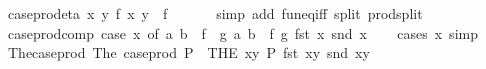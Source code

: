 \begin{isabellebody}
\isanewline
%
\endisadelimproof
\isanewline
{}\isamarkupfalse%
\ case{\isacharunderscore}{\kern0pt}prod{\isacharunderscore}{\kern0pt}eta{\isacharcolon}{\kern0pt}\ {\isachardoublequoteopen}{\isacharparenleft}{\kern0pt}{\isasymlambda}{\isacharparenleft}{\kern0pt}x{\isacharcomma}{\kern0pt}\ y{\isacharparenright}{\kern0pt}{\isachardot}{\kern0pt}\ f\ {\isacharparenleft}{\kern0pt}x{\isacharcomma}{\kern0pt}\ y{\isacharparenright}{\kern0pt}{\isacharparenright}{\kern0pt}\ {\isacharequal}{\kern0pt}\ f{\isachardoublequoteclose}\isanewline
\ \ %
\isanewline
%
\isadelimproof
\ \ %
\endisadelimproof
%
\isatagproof
{}\isamarkupfalse%
\ {\isacharparenleft}{\kern0pt}simp\ add{\isacharcolon}{\kern0pt}\ fun{\isacharunderscore}{\kern0pt}eq{\isacharunderscore}{\kern0pt}iff\ split{\isacharcolon}{\kern0pt}\ prod{\isachardot}{\kern0pt}split{\isacharparenright}{\kern0pt}%
\endisatagproof
{\isafoldproof}%
%
\isadelimproof
\isanewline
%
\endisadelimproof
\isanewline
\isanewline
\isanewline
{}\isamarkupfalse%
\ case{\isacharunderscore}{\kern0pt}prod{\isacharunderscore}{\kern0pt}comp{\isacharcolon}{\kern0pt}\ {\isachardoublequoteopen}{\isacharparenleft}{\kern0pt}case\ x\ of\ {\isacharparenleft}{\kern0pt}a{\isacharcomma}{\kern0pt}\ b{\isacharparenright}{\kern0pt}\ {\isasymRightarrow}\ {\isacharparenleft}{\kern0pt}f\ {\isasymcirc}\ g{\isacharparenright}{\kern0pt}\ a\ b{\isacharparenright}{\kern0pt}\ {\isacharequal}{\kern0pt}\ f\ {\isacharparenleft}{\kern0pt}g\ {\isacharparenleft}{\kern0pt}fst\ x{\isacharparenright}{\kern0pt}{\isacharparenright}{\kern0pt}\ {\isacharparenleft}{\kern0pt}snd\ x{\isacharparenright}{\kern0pt}{\isachardoublequoteclose}\isanewline
%
\isadelimproof
\ \ %
\endisadelimproof
%
\isatagproof
{}\isamarkupfalse%
\ {\isacharparenleft}{\kern0pt}cases\ x{\isacharparenright}{\kern0pt}\ simp%
\endisatagproof
{\isafoldproof}%
%
\isadelimproof
\isanewline
%
\endisadelimproof
\isanewline
{}\isamarkupfalse%
\ The{\isacharunderscore}{\kern0pt}case{\isacharunderscore}{\kern0pt}prod{\isacharcolon}{\kern0pt}\ {\isachardoublequoteopen}The\ {\isacharparenleft}{\kern0pt}case{\isacharunderscore}{\kern0pt}prod\ P{\isacharparenright}{\kern0pt}\ {\isacharequal}{\kern0pt}\ {\isacharparenleft}{\kern0pt}THE\ xy{\isachardot}{\kern0pt}\ P\ {\isacharparenleft}{\kern0pt}fst\ xy{\isacharparenright}{\kern0pt}\ {\isacharparenleft}{\kern0pt}snd\ xy{\isacharparenright}{\kern0pt}{\isacharparenright}{\kern0pt}{\isachardoublequoteclose}\isanewline

\end{isabellebody}
